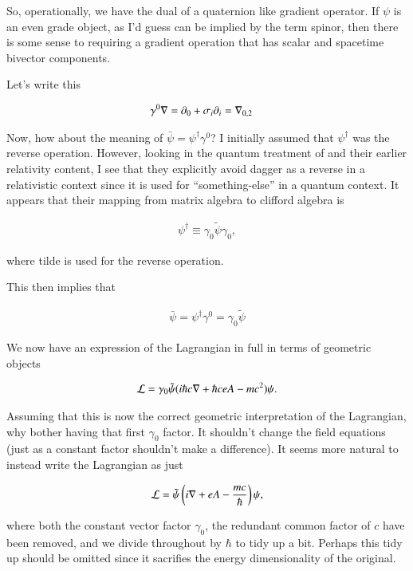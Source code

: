 \documentclass{article}
\begin{document}
So, operationally, we have the dual of a quaternion like gradient operator.  If $\psi$ is an even grade object, as I'd guess can be implied by
the term spinor, then there is some sense to requiring a gradient operation that has scalar and spacetime bivector components.

Let's write this

\begin{align*}
\gamma^0 \nabla &= \partial_0 + \sigma_i \partial_i = {\nabla}_{0,2}
\end{align*}

Now, how about the meaning of $\bar\psi = \psi^\dagger \gamma^0$?  I initially assumed that $\psi^\dagger$ was the reverse operation.
However, looking in the quantum treatment of \cite{doran2003gap} and their earlier relativity content, I see that they explicitly avoid dagger as a reverse in a relativistic context since it is used for ``something-else'' in a quantum context.  It appears that their mapping from matrix algebra to clifford 
algebra is 

\begin{align*}
\psi^\dagger \equiv \gamma_0 \tilde{\psi} \gamma_0,
\end{align*}

where tilde is used for the reverse operation.

This then implies that 

\begin{align*}
\bar \psi = \psi^\dagger \gamma^0 = \gamma_0 \tilde{\psi}
\end{align*}

We now have an expression of the Lagrangian in full in terms of geometric objects

\begin{align}\label{eqn:lag2}
\mathcal{L} = \gamma_0 \tilde{\psi} ( i \hbar c \nabla + \hbar c e A - mc^2) \psi.
\end{align}

Assuming that this is now the correct geometric interpretation of the Lagrangian, why bother having that first $\gamma_0$ factor.  It shouldn't change the field equations (just as a constant factor shouldn't make a difference).  It seems more natural to instead write the Lagrangian as just

\begin{align}\label{eqn:lag3}
\mathcal{L} = \tilde{\psi} \left( i \nabla + e A - \frac{mc}{\hbar} \right) \psi,
\end{align}

where both the constant vector factor $\gamma_0$, the redundant common factor of $c$ have been removed, and we divide throughout by $\hbar$ to tidy up a bit.  Perhaps this tidy up should be omitted since it sacrifies the 
energy dimensionality of the original.
\end{document}
